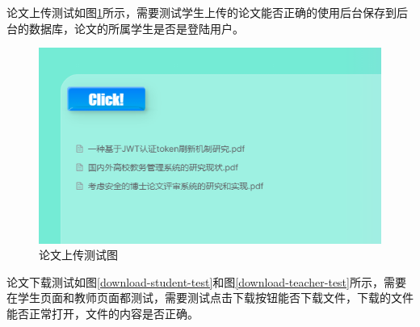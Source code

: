 论文上传测试如图\ref{upload-test}所示，需要测试学生上传的论文能否正确的使用后台保存到后台的数据库，论文的所属学生是否是登陆用户。

\begin{figure}[htbp]
  \centering
  \includegraphics[scale = 0.8]{out/figure/测试/upload-test.png}
  \caption{\song\wuhao 论文上传测试图}
  \label{upload-test}
\end{figure}

论文下载测试如图\ref{download-student-test}和图\ref{download-teacher-test}所示，需要在学生页面和教师页面都测试，需要测试点击下载按钮能否下载文件，下载的文件能否正常打开，文件的内容是否正确。

